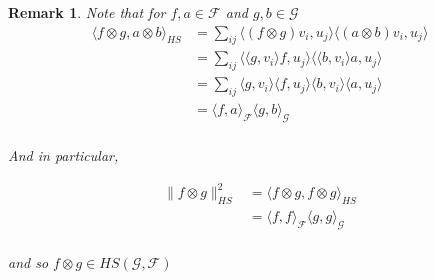 \documentclass[12pt]{article}
\newtheorem*{remark}{Remark}
\numberwithin{claim}{section}
\numberwithin{lemma}{section}
\numberwithin{theorem}{section}
\begin{document}
\begin{remark}
Note that for $f, a \in \mathcal{F}$ and $g, b \in \mathcal{G}$
\begin{align*}
\langle f\otimes g, a\otimes b \rangle_{HS} & =  \sum_{ij} \langle (f\otimes g)v_i ,u_j \rangle \langle  (a\otimes b)v_i ,u_j \rangle \\
& =  \sum_{ij} \langle \langle g,v_i \rangle f ,u_j \rangle \langle  \langle b,v_i \rangle a  ,u_j \rangle \\
&=   \sum_{ij}  \langle g,v_i \rangle \langle f ,u_j \rangle \langle b,v_i \rangle \langle   a  ,u_j \rangle \\
&=   \langle f ,a \rangle_{\mathcal{F}} \langle g,b \rangle_{\mathcal{G}}\\
\end{align*}

And in particular,

\begin{align*}
\|f\otimes g\|_{HS}^2 &= \langle f\otimes g, f\otimes g \rangle_{HS}\\
& = \langle f,f\rangle_\mathcal{F} \langle g, g \rangle_{\mathcal{G}}\\
\end{align*}

and so $f\otimes g \in HS(\mathcal{G},\mathcal{F})$ 

\end{remark}
\end{document}
